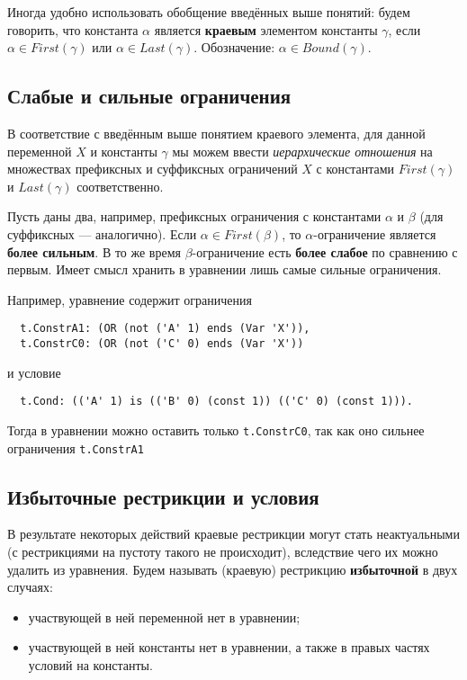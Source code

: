 \documentclass[12pt]{article}
\begin{document}
Иногда удобно использовать обобщение введённых выше понятий: будем
говорить, что константа $\alpha$ является \textbf{краевым} элементом константы
$\gamma$, если $\alpha \in First(\gamma)$ или $\alpha \in Last(\gamma)$.
Обозначение: $\alpha \in Bound(\gamma)$.

\subsection{Слабые и сильные ограничения}

В соответствие с введённым выше понятием краевого элемента, для данной
переменной $X$ и константы $\gamma$ мы можем ввести \textit{иерархические
отношения} на множествах префиксных и суффиксных ограничений $X$ с константами
$First(\gamma)$ и $Last(\gamma)$ соответственно.

Пусть даны два, например, префиксных ограничения с константами $\alpha$ и
$\beta$ (для суффиксных --- аналогично). Если $\alpha \in First(\beta)$, то
$\alpha$-ограничение является \textbf{более сильным}. В то же время
$\beta$-ограничение есть \textbf{более слабое} по сравнению с первым. Имеет
смысл хранить в уравнении лишь самые сильные ограничения.

Например, уравнение содержит ограничения
\begin{Verbatim}
  t.ConstrA1: (OR (not ('A' 1) ends (Var 'X')),
  t.ConstrC0: (OR (not ('C' 0) ends (Var 'X'))
\end{Verbatim}
и условие
\begin{Verbatim}
  t.Cond: (('A' 1) is (('B' 0) (const 1)) (('C' 0) (const 1))).
\end{Verbatim}
Тогда в уравнении можно оставить только \texttt{t.ConstrC0}, так как оно
сильнее ограничения \texttt{t.ConstrA1}

\subsection{Избыточные рестрикции и условия}

В результате некоторых действий краевые рестрикции могут стать неактуальными
(с рестрикциями на пустоту такого не происходит), вследствие чего их
можно удалить из уравнения. Будем называть (краевую) рестрикцию
\textbf{избыточной} в двух случаях:
\begin{itemize}
  \item участвующей в ней переменной нет в уравнении;
  \item участвующей в ней константы нет в уравнении, а также в правых частях
  условий на константы.
\end{itemize}
\end{document}
